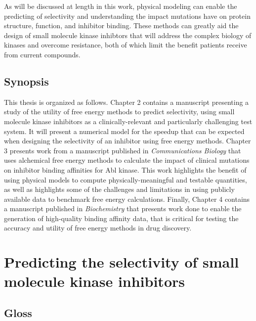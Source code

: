 \documentclass[phd,tocprelim]{cornell}
\begin{document}
As will be discussed at length in this work, physical modeling can enable the predicting of selectivity and understanding the impact mutations have on protein structure, function, and inhibitor binding. These methods can greatly aid the design of small molecule kinase inhibtors that will address the complex biology of kinases and overcome resistance, both of which limit the benefit patients receive from current compounds. 

 \section{Synopsis}
 This thesis is organized as follows. Chapter 2 contains a manuscript presenting a study of the utility of free energy methods to predict selectivity, using small molecule kinase inhibitors as a clinically-relevant and particularly challenging test system. It will present a numerical model for the speedup that can be expected when designing the selectivity of an inhibitor using free energy methods.  Chapter 3  presents work from a manuscript published in \emph{Communications Biology} that uses alchemical free energy methods to calculate the impact of clinical mutations on inhibitor binding affinities for Abl kinase. This work highlights the benefit of using physical models to compute physically-meaningful and testable quantities, as well as highlights some of the challenges and limitations in using publicly available data to benchmark free energy calculations. Finally, Chapter 4 contains a manuscript published in \emph{Biochemistry} that presents work done to enable the generation of high-quality binding affinity data, that is critical for testing the accuracy and utility of free energy methods in drug discovery. 
 
 
 
\chapter{Predicting the selectivity of small molecule kinase inhibitors}

\section{Gloss}
\end{document}
